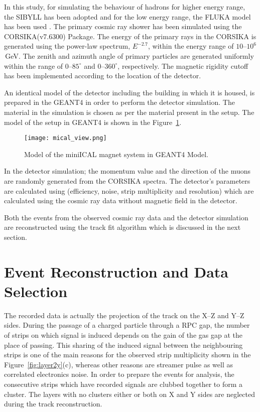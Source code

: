 In this study, for simulating the behaviour of hadrons for higher
energy range, the SIBYLL has been adopted and
for the low energy range, the FLUKA model has been used
\cite{corsika763}. The primary cosmic ray shower has been simulated
using the CORSIKA(v7.6300) Package. The energy of the primary rays in
the CORSIKA is generated using the power-law spectrum, $E^{-2.7}$,
within the energy range of \mbox{$10$--$10^{6}$\,GeV}. The zenith and
azimuth angle of primary particles are generated uniformly within the
range of \mbox{$0$--$85^\circ$} and \mbox{$0$--$360^\circ$},
respectively. The magnetic rigidity cutoff has been implemented
according to the location of the detector.

An identical model of the detector including the building in which it
is housed, is prepared in the GEANT4 in order to perform the detector
simulation. The material in the simulation is chosen as per the
material present in the setup. The model of the setup in GEANT4 is
shown in the Figure~\ref{fig:miniICAL_view}.
\begin{figure}[h]
  \centering
  \texttt{[image: mical\_view.png]}
  \caption{Model of the miniICAL magnet system in GEANT4 Model.}
  \label{fig:miniICAL_view}
\end{figure}
In the detector simulation; the momentum value and the direction
of the muons are randomly generated from the CORSIKA spectra.
The detector's parameters are calculated using (efficiency, noise,
strip multiplicity and resolution) which are calculated using the cosmic
ray data without magnetic field in the detector.

Both the events from the observed cosmic ray data and the detector
simulation are reconstructed using the track fit algorithm which is
discussed in the next section.

\section{Event Reconstruction and Data Selection} \label{sec:momreco}
The recorded data is actually the projection of the track on the
\mbox{X--Z} and \mbox{Y--Z} sides. During the passage of a charged
particle through a RPC gap, the number of strips on which signal is
induced depends on the gain of the gas gap at the place of passing.
This sharing of the induced signal between the neighbouring strips is
one of the main reasons for the observed strip multiplicity shown in the
Figure~\ref{fig:layer2y}(c), whereas other reasons are streamer pulse
as well as correlated electronics noise.
In order to prepare the events for analysis, the consecutive strips
which have recorded signals are clubbed together to form a cluster.
The layers with no clusters either or both on X and Y sides are
neglected during the track reconstruction.

